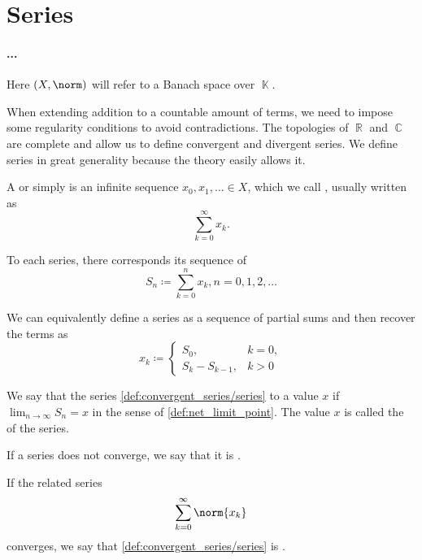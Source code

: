 \section{Series}\label{sec:series}

\paragraph{...}

Here \( (X, \norm) \) will refer to a Banach space over \( \BbbK \).

\begin{definition}\label{def:convergent_series}
  When extending addition to a countable amount of terms, we need to impose some regularity conditions to avoid contradictions. The topologies of \( \BbbR \) and \( \BbbC \) are complete and allow us to define convergent and divergent series. We define series in great generality because the theory easily allows it.

  A  or simply  is an infinite sequence \( x_0, x_1, \ldots \in X \), which we call , usually written as
  \begin{equation}\label{def:convergent_series/series}
    \sum_{k=0}^\infty x_k.
  \end{equation}

  To each series, there corresponds its sequence of 
  \begin{equation*}
    S_n \coloneqq \sum_{k=0}^n x_k, n = 0, 1, 2, \ldots
  \end{equation*}

  We can equivalently define a series as a sequence of partial sums and then recover the terms as
  \begin{equation*}
    x_k \coloneqq \begin{cases}
      S_0,           & k = 0, \\
      S_k - S_{k-1}, & k > 0
    \end{cases}
  \end{equation*}

  We say that the series \eqref{def:convergent_series/series}  to a value \( x \) if \( \lim_{n \to \infty} S_n = x \) in the sense of \cref{def:net_limit_point}. The value \( x \) is called the  of the series.

  If a series does not converge, we say that it is .

  If the related series
  \begin{equation}\label{def:convergent_series/absolute_series}
    \sum_{k=0}^\infty \norm{x_k}
  \end{equation}
  converges, we say that \eqref{def:convergent_series/series} is .
\end{definition}

